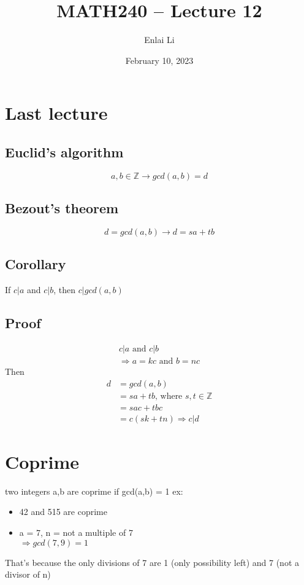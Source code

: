 \documentclass{article}
\author{Enlai Li}
\title{MATH240 -- Lecture 12}
\date{February 10, 2023}
\begin{document}
\maketitle
\section{Last lecture}
\subsection{Euclid's algorithm}
\[
    a,b \in \mathbb{Z} \rightarrow gcd(a,b) = d
\]
\subsection{Bezout's theorem}
\[
    d = gcd(a,b) \rightarrow d = sa + tb
\]
\subsection{Corollary}
If $c|a$ and $c|b$, then $c|gcd(a,b)$

\subsection{Proof}
\begin{gather*}
    c|a \text{ and } c|b \\
    \Rightarrow a = kc \text{ and } b = nc
\end{gather*}
Then
\begin{align*}
    d
     & = gcd(a,b)                                   \\
     & = sa + tb \text{, where } s,t \in \mathbb{Z} \\
     & = sac + tbc                                  \\
     & = c(sk+tn) \Rightarrow c|d
\end{align*}

\section{Coprime}
two integers a,b are coprime if gcd(a,b) = 1
ex:
\begin{itemize}
    \item 42 and 515 are coprime
    \item a = 7, n = not a multiple of 7 \\ $\Rightarrow gcd(7,9)=1$
\end{itemize}
That's because the only divisions of 7 are 1 (only possibility left) and 7 (not a divisor of n)
\end{document}
